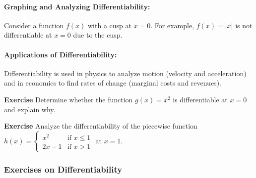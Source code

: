 \documentclass[a4paper,12pt]{book}
\newenvironment{exercise}[1][]
  {\par\medskip\noindent\textbf{Exercise #1} \rmfamily}
  {\medskip}
\newcounter{example}
\begin{document}
\paragraph{Graphing and Analyzing Differentiability:}
Consider a function \( f(x) \) with a cusp at \( x = 0 \). For example, \( f(x) = |x| \) is not differentiable at \( x = 0 \) due to the cusp.



\paragraph{Applications of Differentiability:}
Differentiability is used in physics to analyze motion (velocity and acceleration) and in economics to find rates of change (marginal costs and revenues).

\begin{exercise}
Determine whether the function \( g(x) = x^2 \) is differentiable at \( x = 0 \) and explain why.
\end{exercise}

\begin{exercise}
Analyze the differentiability of the piecewise function \( h(x) = 
\begin{cases} 
x^2 & \text{if } x \leq 1 \\
2x - 1 & \text{if } x > 1 
\end{cases} \) at \( x = 1 \).
\end{exercise}

\subsubsection*{Exercises on Differentiability}
\end{document}
